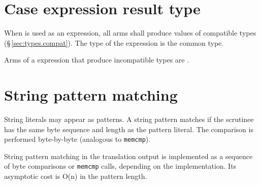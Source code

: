 \section{Case expression result type}
\label{sec:match.type}

\pnum
When  is used as an expression, all arms shall produce values
of compatible types (\S\,\ref{sec:types.compat}).  The type of the
 expression is the common type.

\begin{constraint}
  Arms of a  expression that produce incompatible types are
  \illformed{}.
\end{constraint}

\section{String pattern matching}
\label{sec:match.string}

\pnum
String literals may appear as patterns.  A string pattern matches if the
scrutinee has the same byte sequence and length as the pattern literal.
The comparison is performed byte-by-byte (analogous to \texttt{memcmp}).

\begin{note}
  String pattern matching in the translation output is implemented as a
  sequence of byte comparisons or \texttt{memcmp} calls, depending on
  the implementation.  Its asymptotic cost is O(n) in the pattern length.
\end{note}
